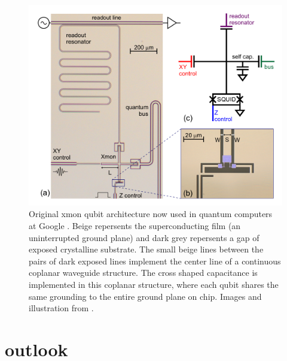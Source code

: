 \documentclass[%
 reprint,
showpacs,
 amsmath,amssymb,
 aps,
longbibliography,
]{revtex4-1}
\begin{document}
\begin{figure}[h!]
  \includegraphics[width=\linewidth]{xmon.png}
  \caption{Original xmon qubit architecture now used in quantum computers at Google \cite{google}. Beige repersents the superconducting film (an uninterrupted ground plane) and dark grey repersents a gap of exposed crystalline substrate. The small beige lines between the pairs of dark exposed lines implement the center line of a continuous coplanar waveguide structure. The cross shaped capacitance is implemented in this coplanar structure, where each qubit shares the same grounding to the entire ground plane on chip. Images and illustration from \cite{xmon}.}
  \label{fig:xmon}
\end{figure}



\section{outlook}
\end{document}
